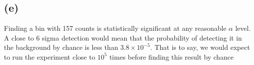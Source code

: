 \documentclass[12pt]{article}
\begin{document}
\subsection*{(e)}
Finding a bin with 157 counts is statistically significant at any reasonable $\alpha$ level.  A close to 6 sigma detection would mean that the probability of detecting it in the background by chance is less than $3.8 \times 10^{-5}$.  That is to say, we would expect to run the experiment close to $10^5$ times before finding this result by chance
\end{document}
